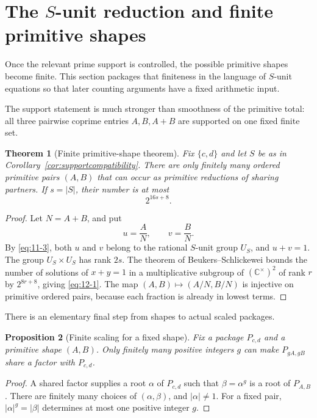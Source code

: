 \documentclass[11pt]{article}
\numberwithin{equation}{section}
\newtheorem{theorem}{Theorem}[section]
\newtheorem{proposition}[theorem]{Proposition}
\theoremstyle{definition}
\newcommand{\C}{\mathbb C}
\begin{document}
\section{The \texorpdfstring{\(S\)}{S}-unit reduction and finite primitive shapes}

Once the relevant prime support is controlled, the possible primitive shapes become finite.  This section packages that finiteness in the language of \(S\)-unit equations so that later counting arguments have a fixed arithmetic input.
\label{sec:sunit}

The support statement is much stronger than smoothness of the primitive total:
all three pairwise coprime entries \(A,B,A+B\) are supported on one fixed
finite set.

\begin{theorem}[Finite primitive-shape theorem]
\label{thm:finiteshapes}
Fix \(\{c,d\}\) and let \(S\) be as in
Corollary~\ref{cor:supportcompatibility}.  There are only finitely many
ordered primitive pairs \((A,B)\) that can occur as primitive reductions of
sharing partners.  If \(s=|S|\), their number is at most
\begin{equation}
 2^{16s+8}.
 \label{eq:12-1}
\end{equation}
\end{theorem}

\begin{proof}
Let \(N=A+B\), and put
\[
 u=\frac{A}{N},\qquad v=\frac{B}{N}.
\]
By \eqref{eq:11-3}, both \(u\) and \(v\) belong to the rational \(S\)-unit
group \(U_S\), and \(u+v=1\).  The group
\(U_S\times U_S\) has rank \(2s\).  The theorem of
Beukers--Schlickewei \cite{BeukersSchlickewei1996} bounds the number of
solutions of \(x+y=1\) in a multiplicative subgroup of
\((\C^\times)^2\) of rank \(r\) by \(2^{8r+8}\), giving \eqref{eq:12-1}.
The map \((A,B)\mapsto(A/N,B/N)\) is injective on primitive ordered pairs,
because each fraction is already in lowest terms.
\end{proof}

There is an elementary final step from shapes to actual scaled packages.

\begin{proposition}[Finite scaling for a fixed shape]
\label{prop:finitescaling}
Fix a package \(P_{c,d}\) and a primitive shape \((A,B)\).  Only finitely
many positive integers \(g\) can make \(P_{gA,gB}\) share a factor with
\(P_{c,d}\).
\end{proposition}

\begin{proof}
A shared factor supplies a root \(\alpha\) of \(P_{c,d}\) such that
\(\beta=\alpha^g\) is a root of \(P_{A,B}\).  There are finitely many
choices of \((\alpha,\beta)\), and \(|\alpha|\neq1\).  For a fixed pair,
\(|\alpha|^g=|\beta|\) determines at most one positive integer \(g\).
\end{proof}
\end{document}
